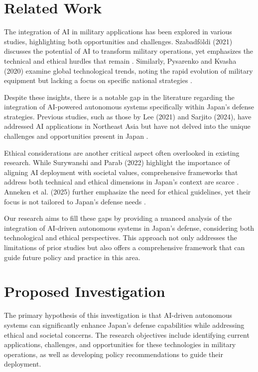 \documentclass{article} %
\begin{document}
\section{Related Work}
\label{sec:related}

The integration of AI in military applications has been explored in various studies, highlighting both opportunities and challenges. Szabadföldi (2021) discusses the potential of AI to transform military operations, yet emphasizes the technical and ethical hurdles that remain \citep{szabadfoldi2021military}. Similarly, Pysarenko and Kvasha (2020) examine global technological trends, noting the rapid evolution of military equipment but lacking a focus on specific national strategies \citep{pysarenko2020trends}.

Despite these insights, there is a notable gap in the literature regarding the integration of AI-powered autonomous systems specifically within Japan's defense strategies. Previous studies, such as those by Lee (2021) and Sarjito (2024), have addressed AI applications in Northeast Asia but have not delved into the unique challenges and opportunities present in Japan \citep{Lee2021ACS, Sarjito2024EnhancingBA}.

Ethical considerations are another critical aspect often overlooked in existing research. While Surywanshi and Parab (2022) highlight the importance of aligning AI deployment with societal values, comprehensive frameworks that address both technical and ethical dimensions in Japan's context are scarce \citep{Surywanshi2022ArtificialII}. Anneken et al. (2025) further emphasize the need for ethical guidelines, yet their focus is not tailored to Japan's defense needs \citep{Anneken2025EthicalCF}.

Our research aims to fill these gaps by providing a nuanced analysis of the integration of AI-driven autonomous systems in Japan's defense, considering both technological and ethical perspectives. This approach not only addresses the limitations of prior studies but also offers a comprehensive framework that can guide future policy and practice in this area.

\section{Proposed Investigation}
\label{sec:investigation}

The primary hypothesis of this investigation is that AI-driven autonomous systems can significantly enhance Japan's defense capabilities while addressing ethical and societal concerns. The research objectives include identifying current applications, challenges, and opportunities for these technologies in military operations, as well as developing policy recommendations to guide their deployment.
\end{document}
